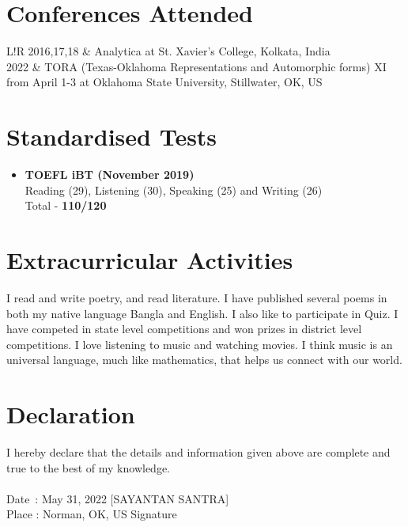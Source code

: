 \documentclass{article}
\newcommand\VRule{\color{lightgray}\vrule width 0.5pt}
\begin{document}
	\section*{Conferences Attended}
	\begin{tabular}{L!{\VRule}R}
		2016,17,18 & Analytica at St. Xavier's College, Kolkata, India \\
		2022 & TORA (Texas-Oklahoma Representations and Automorphic forms) XI from April 1-3 at Oklahoma State University, Stillwater, OK, US
	\end{tabular}
	\section*{Standardised Tests}
	\begin{itemize}
		\item {\bf TOEFL iBT (November 2019)} \\
			Reading (29), Listening (30), Speaking (25) and Writing (26) \\
			Total - {\bf 110/120}
	\end{itemize}
	\section*{Extracurricular Activities}
	I read and write poetry, and read literature. I have published several poems in both my native language Bangla and English. I also like to participate in Quiz. I have competed in state level competitions and won prizes in district level competitions. I love listening to music and watching movies. I think music is an universal language, much like mathematics, that helps us connect with our world.
	\section*{Declaration}
	I hereby declare that the details and information given above are complete and true to the best of my knowledge. \\
	\vspace{2cm} \\
	Date \,: May 31, 2022 \hfill [SAYANTAN SANTRA] \\
	Place  : Norman, OK, US \hfill Signature \hspace{1cm} \\
\end{document}
